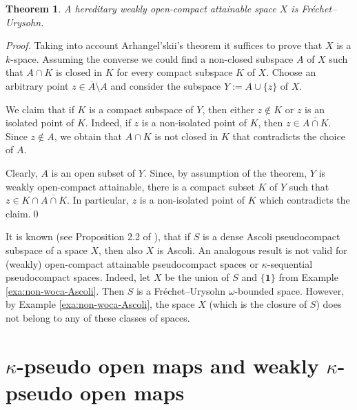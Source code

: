 \documentclass[preprint,11pt]{elsarticle}
\newtheorem{theorem}{Theorem}[section]
\numberwithin{equation}{section}
\numberwithin{theorem}{section}
\newcommand{\w}{\omega}
\newcommand{\SM}{{\setminus}}
\begin{document}
\begin{theorem} \label{t:woca-hereditary}
A hereditary weakly open-compact attainable space $X$ is Fr\'{e}chet--Urysohn.
\end{theorem}

\begin{proof}
Taking into account Arhangel'skii's theorem \cite[3.12.15]{Eng} it suffices to prove that $X$ is a $k$-space. Assuming the converse we could find a non-closed subspace $A$ of $X$ such that $A\cap K$ is closed in $K$ for every compact subspace $K$ of $X$. Choose an arbitrary point $z\in \overline{A}\SM A$ and consider the subspace $Y:= A\cup\{ z\}$ of $X$.

We claim that if $K$ is a compact subspace of $Y$, then either $z\not\in K$ or $z$ is an isolated point of $K$. Indeed, if $z$ is a non-isolated point of $K$, then $z \in \overline{A\cap K}$. Since $z\not\in A$, we obtain that $A\cap K$ is not closed in $K$ that contradicts the choice of $A$.

Clearly, $A$ is an open subset of $Y$. Since, by assumption of the theorem, $Y$ is  weakly open-compact attainable, there is a compact subset $K$ of $Y$ such that $z\in K\cap \overline{A\cap K}$. In particular, $z$ is  a non-isolated point of $K$ which contradicts the claim.\qed
\end{proof}




It is known (see Proposition 2.2 of \cite{Gabr-pseudo-Ascoli}), that if $S$ is a dense Ascoli pseudocompact subspace of a space $X$, then also $X$ is Ascoli. An analogous result is not valid for (weakly) open-compact attainable  pseudocompact spaces or  $\kappa$-sequential pseudocompact spaces. Indeed, let $X$ be the union of $S$ and $\{\mathbf{1}\}$ from Example \ref{exa:non-woca-Ascoli}. Then $S$ is a Fr\'{e}chet--Urysohn $\w$-bounded space. However, by Example \ref{exa:non-woca-Ascoli},  the space $X$ (which is the  closure of $S$)  does not belong to any of these classes of spaces.



\section{$\kappa$-pseudo open maps and weakly  $\kappa$-pseudo open maps} \label{sec:maps}
\end{document}
